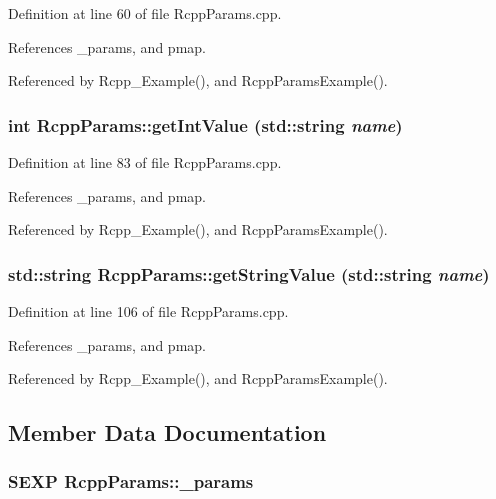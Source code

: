 Definition at line 60 of file RcppParams.cpp.

References \_\-params, and pmap.

Referenced by Rcpp\_\-Example(), and RcppParamsExample().\hypertarget{classRcppParams_abb554151641ab12a793f28d3d081973a}{
\subsubsection[{getIntValue}]{\setlength{\rightskip}{0pt plus 5cm}int RcppParams::getIntValue (std::string {\em name})}}
\label{classRcppParams_abb554151641ab12a793f28d3d081973a}


Definition at line 83 of file RcppParams.cpp.

References \_\-params, and pmap.

Referenced by Rcpp\_\-Example(), and RcppParamsExample().\hypertarget{classRcppParams_adc04f4552582eeec09b0806ddd8e2581}{
\subsubsection[{getStringValue}]{\setlength{\rightskip}{0pt plus 5cm}std::string RcppParams::getStringValue (std::string {\em name})}}
\label{classRcppParams_adc04f4552582eeec09b0806ddd8e2581}


Definition at line 106 of file RcppParams.cpp.

References \_\-params, and pmap.

Referenced by Rcpp\_\-Example(), and RcppParamsExample().

\subsection{Member Data Documentation}
\hypertarget{classRcppParams_a3040dda3b32eff66fb73d3ba3874ca5b}{
\subsubsection[{\_\-params}]{\setlength{\rightskip}{0pt plus 5cm}SEXP {\bf RcppParams::\_\-params}}}
\label{classRcppParams_a3040dda3b32eff66fb73d3ba3874ca5b}


